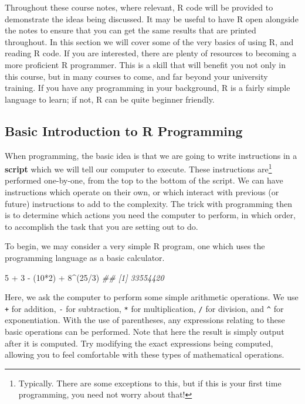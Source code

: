 \documentclass[
  letterpaper,
  DIV=11,
  numbers=noendperiod]{scrreprt}
\newenvironment{Shaded}{\begin{snugshade}}{\end{snugshade}}
\newcommand{\DecValTok}[1]{\textcolor[rgb]{0.68,0.00,0.00}{#1}}
\newcommand{\DocumentationTok}[1]{\textcolor[rgb]{0.37,0.37,0.37}{\textit{#1}}}
\newcommand{\NormalTok}[1]{\textcolor[rgb]{0.00,0.23,0.31}{#1}}
\newcommand{\SpecialCharTok}[1]{\textcolor[rgb]{0.37,0.37,0.37}{#1}}
\theoremstyle{definition}
\theoremstyle{definition}
\theoremstyle{definition}
\theoremstyle{remark}
\begin{document}
Throughout these course notes, where relevant, R code will be provided
to demonstrate the ideas being discussed. It may be useful to have R
open alongside the notes to ensure that you can get the same results
that are printed throughout. In this section we will cover some of the
very basics of using R, and reading R code. If you are interested, there
are plenty of resources to becoming a more proficient R programmer. This
is a skill that will benefit you not only in this course, but in many
courses to come, and far beyond your university training. If you have
any programming in your background, R is a fairly simple language to
learn; if not, R can be quite beginner friendly.

\subsection{Basic Introduction to R
Programming}\label{basic-introduction-to-r-programming}

When programming, the basic idea is that we are going to write
instructions in a \textbf{script} which we will tell our computer to
execute. These instructions are\footnote{Typically. There are some
  exceptions to this, but if this is your first time programming, you
  need not worry about that!} performed one-by-one, from the top to the
bottom of the script. We can have instructions which operate on their
own, or which interact with previous (or future) instructions to add to
the complexity. The trick with programming then is to determine which
actions you need the computer to perform, in which order, to accomplish
the task that you are setting out to do.

To begin, we may consider a very simple R program, one which uses the
programming language as a basic calculator.

\begin{Shaded}
\begin{Highlighting}[]
\DecValTok{5} \SpecialCharTok{+} \DecValTok{3} \SpecialCharTok{{-}}\NormalTok{ (}\DecValTok{10}\SpecialCharTok{*}\DecValTok{2}\NormalTok{) }\SpecialCharTok{+} \DecValTok{8}\SpecialCharTok{\^{}}\NormalTok{(}\DecValTok{25}\SpecialCharTok{/}\DecValTok{3}\NormalTok{)}
\DocumentationTok{\#\# [1] 33554420}
\end{Highlighting}
\end{Shaded}

Here, we ask the computer to perform some simple arithmetic operations.
We use \texttt{+} for addition, \texttt{-} for subtraction, \texttt{*}
for multiplication, \texttt{/} for division, and \texttt{\^{}} for
exponentiation. With the use of parentheses, any expressions relating to
these basic operations can be performed. Note that here the result is
simply output after it is computed. Try modifying the exact expressions
being computed, allowing you to feel comfortable with these types of
mathematical operations.
\end{document}
